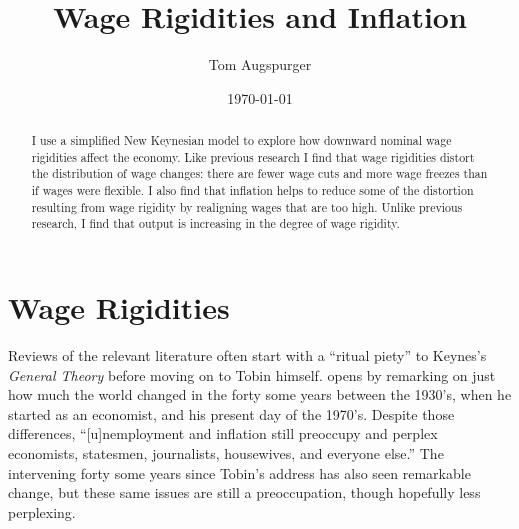 \documentclass[12pt,a4paper]{scrartcl}            %
\begin{document}
\makeatletter
\def\blfootnote{\xdef\@thefnmark{}\@footnotetext}
\makeatother



\title{Wage Rigidities and Inflation}
\author{Tom Augspurger}                               %
\date{\monthYear\today}
\maketitle

\begin{abstract}
I use a simplified New Keynesian model to explore how downward nominal wage rigidities affect the economy.
Like previous research I find that wage rigidities distort the distribution of wage changes:
there are fewer wage cuts and more wage freezes than if wages were flexible.
I also find that inflation helps to reduce some of the distortion resulting from wage rigidity by realigning wages that are too high.
Unlike previous research, I find that output is increasing in the degree of wage rigidity.

\end{abstract}

\section{Wage Rigidities}
\label{sec:wage_rigidities}

Reviews of the relevant literature often start with a ``ritual piety'' \citep{tobin_1972} to Keynes's \emph{General Theory} before moving on to Tobin himself.
\cite{tobin_1972} opens by remarking on just how much the world changed in the forty some years between the 1930's, when he started as an economist, and his present day of the 1970's.
Despite those differences, ``[u]nemployment and inflation still preoccupy and perplex economists, statesmen, journalists, housewives, and everyone else.''
The intervening forty some years since Tobin's address has also seen remarkable change, but these same issues are still a preoccupation, though hopefully less perplexing.
\end{document}
